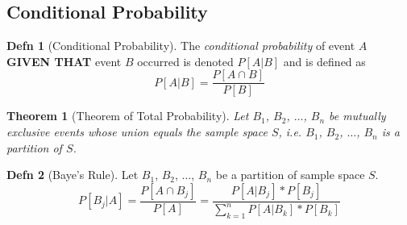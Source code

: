 \documentclass[10pt,letterpaper,final,twoside,notitlepage]{article}
\theoremstyle{plain}
\newtheorem{theorem}{Theorem}
\theoremstyle{definition}
\newtheorem{definition}{Defn}
\begin{document}
	\subsection{Conditional Probability} \label{subsec:Conditional Probability}
		\begin{definition}[Conditional Probability] \label{def:Conditional Probability}
			The \emph{conditional probability} of event $A$ \textbf{GIVEN THAT} event $B$ occurred is denoted $P \left[ A \vert B \right]$ and is defined as
			\begin{equation} 
				P \left[ A \vert B \right] = \frac{P \left[ A \cap B \right]}{P \left[ B \right]}
			\end{equation}
		\end{definition}
		\begin{theorem}[Theorem of Total Probability]
			Let $B_{1}$, $B_{2}$, $\ldots$, $B_{n}$ be mutually exclusive events whose union equals the sample space $S$, i.e. $B_{1}$, $B_{2}$, $\ldots$, $B_{n}$ is a \emph{partition of $S$}.
		\end{theorem}
		\begin{definition}[Baye's Rule]
			Let $B_{1}$, $B_{2}$, $\ldots$, $B_{n}$ be a partition of sample space $S$.
			\begin{equation}
				P \left[ B_{j} \vert A \right] = \frac{P \left[ A \cap B_{j} \right]}{P \left[ A \right]} = \frac{P \left[ A \vert B_{j} \right] * P \left[ B_{j} \right]}{\sum_{k=1}^{n} P \left[ A \vert B_{k} \right] * P \left[ B_{k} \right]}
			\end{equation}
		\end{definition}
	
\end{document}
